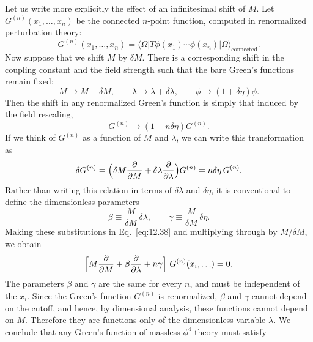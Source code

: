 Let us write more explicitly the effect of an infinitesimal shift of $M$.
Let $G^{(n)}(x_1, \ldots, x_n)$ be the connected $n$-point function, computed
in renormalized perturbation theory:
\begin{equation}
  G^{(n)}(x_1, \ldots, x_n) = \langle\Omega|T\phi(x_1)\cdots\phi(x_n)
    |\Omega\rangle_{\mathrm{connected}} .
  \label{eq:12.36}
\end{equation}
Now suppose that we shift $M$ by $\delta M$.  There is a corresponding shift
in the coupling constant and the field strength such that the bare Green's
functions remain fixed:
\begin{equation}
  M \to M + \delta M,\qquad \lambda \to \lambda + \delta\lambda,\qquad
  \phi \to (1+\delta\eta)\phi .
  \label{eq:12.37}
\end{equation}
Then the shift in any renormalized Green's function is simply that induced by
the field rescaling,
\begin{equation}
  G^{(n)} \to (1+n\delta\eta)G^{(n)} .
\end{equation}
If we think of $G^{(n)}$ as a function of $M$ and $\lambda$, we can write this
transformation as
\begin{equation}
  \delta G^{(n)} = \Bigl( \delta M\frac{\partial}{\partial M}
    + \delta\lambda\frac{\partial}{\partial\lambda} \Bigr)G^{(n)}
  = n\delta\eta\,G^{(n)} .
  \label{eq:12.38}
\end{equation}
Rather than writing this relation in terms of $\delta\lambda$ and
$\delta\eta$, it is conventional to define the dimensionless parameters
\begin{equation}
  \beta \equiv \frac{M}{\delta M}\,\delta\lambda,\qquad
  \gamma \equiv \frac{M}{\delta M}\,\delta\eta .
  \label{eq:12.39}
\end{equation}
Making these substitutions in Eq.~\eqref{eq:12.38} and multiplying through by
$M/\delta M$, we obtain
\begin{equation}
  \Bigl[ M\frac{\partial}{\partial M} + \beta\frac{\partial}{\partial\lambda}
    + n\gamma \Bigr]\ G^{(n)}(x_i, \ldots) = 0 .
  \label{eq:12.40}
\end{equation}
The parameters $\beta$ and $\gamma$ are the same for every $n$, and must be
independent of the $x_i$.  Since the Green's function $G^{(n)}$ is
renormalized, $\beta$ and $\gamma$ cannot depend on the cutoff, and hence, by
dimensional analysis, these functions cannot depend on $M$.  Therefore they
are functions only of the dimensionless variable $\lambda$.  We conclude that
any Green's function of massless $\phi^4$ theory must satisfy
